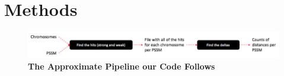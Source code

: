 \documentclass{article}
\newcommand{\tab}{\hspace{9mm}}
\begin{document}



\section{Methods}

\begin{figure}[H]
  \centering
  \includegraphics[scale=0.5]{pipeline.png}
  \caption{\textbf{The Approximate Pipeline our Code Follows}}
  \label{fig:pipeline}
\end{figure}
\end{document}
